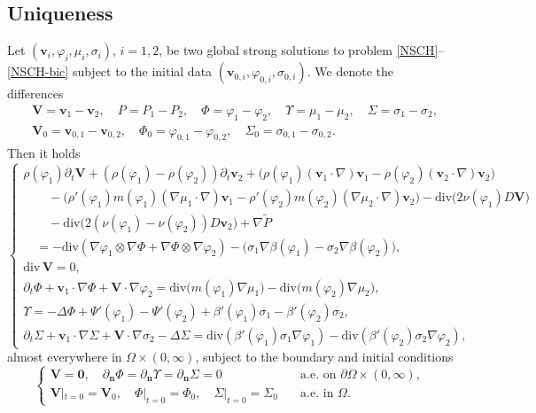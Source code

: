 \documentclass[11pt,reqno]{amsart}
\def\n{{\bm{n}}}
\def\div{\mathrm{div}}
\def\vv{\bm{v}}
\begin{document}
\subsection{Uniqueness}
Let $(\vv_i,\varphi_i,\mu_i,\sigma_i)$, $i=1,2$, be two global strong solutions to problem \eqref{NSCH}--\eqref{NSCH-bic} subject to the initial data $(\vv_{0,i},\varphi_{0,i},\sigma_{0,i})$. We denote the differences
%
\begin{align*}
& \bm{V}=\vv_1-\vv_2,\quad P=P_1-P_2,
\quad \Phi=\varphi_1-\varphi_2,
\quad \Upsilon= \mu_1-\mu_2,
\quad \Sigma=\sigma_1-\sigma_2,\\
&\bm{V}_0=\vv_{0,1}-\vv_{0,2},
\quad \Phi_0=\varphi_{0,1}-\varphi_{0,2},
\quad \Sigma_0=\sigma_{0,1}-\sigma_{0,2}.
\end{align*}
%
Then it holds
%
\begin{equation}
 \label{di-NSCH}
\begin{cases}
\rho(\varphi_1) \partial_t \bm{V}
+ (\rho(\varphi_1)-\rho(\varphi_2))\partial_t\vv_2
+ \big(\rho(\varphi_1)(\vv_1\cdot\nabla)\vv_1-\rho(\varphi_2)(\vv_2\cdot\nabla)\vv_2\big)
\\
\qquad
 - \big(
\rho'(\varphi_1)m(\varphi_1)(\nabla \mu_1\cdot\nabla) \vv_1-
\rho'(\varphi_2)m(\varphi_2)(\nabla \mu_2\cdot\nabla) \vv_2
\big)
- \div \big( 2\nu(\varphi_1) D \bm{V} \big)
\\
\qquad - \div \big( 2(\nu(\varphi_1)-\nu(\varphi_2)) D \vv_2 \big)
+ \nabla \widetilde{P}
\\
\quad = -\div(\nabla \varphi_1\otimes \nabla \Phi
+ \nabla \Phi\otimes \nabla \varphi_2)
-\big(\sigma_1  \nabla \beta(\varphi_1) - \sigma_2  \nabla \beta(\varphi_2)\big),
\\
\div \, \bm{V} =0,
\\
\partial_t \Phi + \vv_1\cdot \nabla \Phi
+ \bm{V} \cdot \nabla \varphi_2
=
\div\big(m(\varphi_1)\nabla \mu_1\big)-\div\big(m(\varphi_2)\nabla \mu_2\big),
\\
\Upsilon = - \Delta \Phi+ \Psi'(\varphi_1)-\Psi'(\varphi_2) + \beta'(\varphi_1) \sigma_1-\beta'(\varphi_2) \sigma_2,
\\
\partial_t \Sigma + \vv_1 \cdot \nabla \Sigma
+ \bm{V} \cdot \nabla \sigma_2 - \Delta \Sigma
= \div \left( \beta'(\varphi_1)\sigma_1 \nabla \varphi_1\right) -\div \left( \beta'(\varphi_2)\sigma_2 \nabla \varphi_2\right),
\end{cases}
\end{equation}
%
almost everywhere in $\Omega \times (0,\infty)$, subject to the boundary and initial conditions
%
\begin{equation}
\label{di-NSCH-bic}
\begin{cases}
\bm{V}=\mathbf{0}, \quad \partial_\n \Phi=\partial_\n \Upsilon=\partial_\n \Sigma=0 \quad &\text{a.e. on }  \partial \Omega \times (0,\infty),\\
\bm{V}|_{t=0}=\bm{V}_0, \quad \Phi|_{t=0}=\Phi_0, \quad \Sigma|_{t=0}=\Sigma_0 \quad
&\text{a.e. in } \Omega.
\end{cases}
\end{equation}
\end{document}
